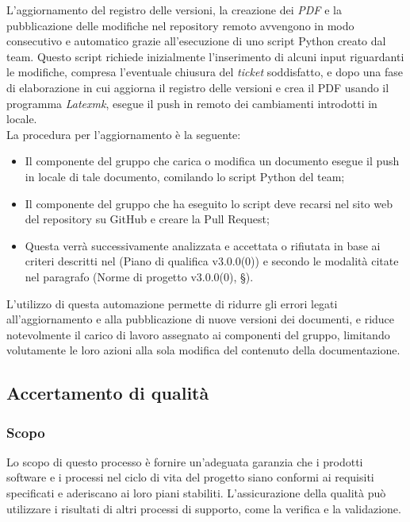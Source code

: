 \documentclass[10pt, a4paper]{article}
\begin{document}
\label{sec:automazione_docs}
L'aggiornamento del registro delle versioni, la creazione dei \textit{PDF\pg} e la pubblicazione delle modifiche nel repository remoto avvengono in modo consecutivo e automatico grazie all'esecuzione di uno script Python creato dal team.
Questo script richiede inizialmente l'inserimento di alcuni input riguardanti le modifiche, compresa l'eventuale chiusura del \textit{ticket} soddisfatto, e dopo una fase di elaborazione
in cui aggiorna il registro delle versioni e crea il PDF usando il programma \textit{Latexmk}, esegue il push in remoto dei cambiamenti introdotti in locale.\\
La procedura per l'aggiornamento è la seguente:
\begin{itemize}
    \item Il componente del gruppo che carica o modifica un documento esegue il push in locale di tale documento, comilando lo script Python del team;
    \item Il componente del gruppo che ha eseguito lo script deve recarsi nel sito web del repository su GitHub e creare la Pull Request;
    \item Questa verrà successivamente analizzata e accettata o rifiutata in base ai criteri descritti nel (Piano di qualifica v3.0.0(0)) e
    secondo le modalità citate nel paragrafo (Norme di progetto v3.0.0(0), \S {}).
\end{itemize}
L'utilizzo di questa automazione permette di ridurre gli errori legati all'aggiornamento e alla pubblicazione di nuove
versioni dei documenti, e riduce notevolmente il carico di lavoro assegnato ai componenti del gruppo, limitando
volutamente le loro azioni alla sola modifica del contenuto della documentazione.


\subsection{Accertamento di qualità}
\subsubsection{Scopo}
Lo scopo di questo processo è fornire un'adeguata garanzia che i prodotti software e i processi nel ciclo di vita del progetto siano conformi ai requisiti specificati e aderiscano ai loro piani stabiliti.
L'assicurazione della qualità può utilizzare i risultati di altri processi di supporto, come la verifica e la validazione.
\end{document}
